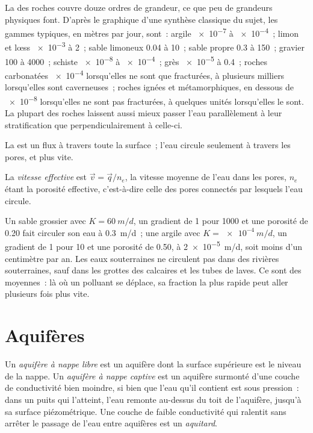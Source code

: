 La  des roches couvre douze ordres de
grandeur, ce que peu de grandeurs physiques font. D'après le graphique d'une
synthèse classique du sujet, les gammes typiques, en mètres par jour, sont~: argile
\num{e-7} à \num{e-4}~; limon et lœss \num{e-3} à 2~; sable limoneux 0.04 à
10~; sable propre 0.3 à 150~; gravier 100 à 4000~; schiste \num{e-8} à
\num{e-4}~; grès \num{e-5} à 0.4~; roches carbonatées \num{e-4} lorsqu'elles
ne sont que fracturées, à plusieurs milliers lorsqu'elles sont caverneuses~; roches ignées et
métamorphiques, en dessous de \num{e-8} lorsqu'elles ne sont pas fracturées, à quelques
unités lorsqu'elles le sont. La plupart des roches laissent aussi mieux passer l'eau
parallèlement à leur stratification que perpendiculairement à celle-ci.

La  est un flux à travers toute la surface~; l'eau circule
seulement à travers les pores, et plus vite.

\begin{definition}\label{def:b3:hydrogeology:seepage}
La \emph{vitesse effective} est $\vec v = \vec
q/n_e$, la vitesse moyenne de l'eau dans les pores, $n_e$ étant la
porosité effective, c'est-à-dire celle des pores connectés par lesquels
l'eau circule.
\end{definition}

Un sable grossier avec $K = \qty{60}{m/d}$, un gradient de 1 pour 1000 et une
porosité de 0.20 fait circuler son eau à \qty{0.3}{m/d}~; une argile avec $K =
\qty{e-4}{m/d}$, un gradient de 1 pour 10 et une porosité de 0.50, à
\qty{2e-5}{m/d}, soit moins d'un centimètre par an. Les eaux souterraines ne circulent
pas dans des rivières souterraines, sauf dans les grottes des calcaires et les tubes de
laves. Ce sont des moyennes~: là où un polluant se déplace, sa fraction la plus rapide peut
aller plusieurs fois plus vite.

\section{Aquifères}\label{sec:b3:hydrogeology:aquifers}

\begin{definition}\label{def:b3:hydrogeology:aquifer-types}
Un \emph{aquifère à nappe libre} est un aquifère dont
la surface supérieure est le niveau de la nappe. Un \emph{aquifère à nappe
captive} est un aquifère surmonté d'une couche de
conductivité bien moindre, si bien que l'eau qu'il contient est sous pression~: dans un
puits qui l'atteint, l'eau remonte au-dessus du toit de l'aquifère, jusqu'à sa
surface piézométrique. Une couche de faible conductivité qui ralentit sans
arrêter le passage de l'eau entre aquifères est un
\emph{aquitard}.
\end{definition}

